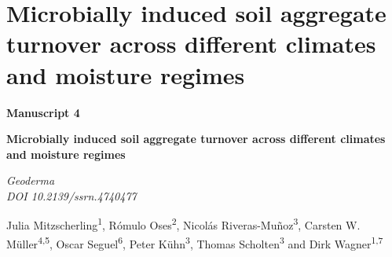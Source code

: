 \chapter{Microbially induced soil aggregate turnover across different climates and moisture regimes}
\label{chap:manuscript4} %

\begin{center}
  \textbf{\Large Manuscript 4}
\end{center}  

\vspace{0.1cm}

\begin{center}
  \textbf{\huge Microbially induced soil aggregate turnover across different climates and moisture regimes}
\end{center}

\vspace{0.2cm}

\begin{center}
  \textit{Geoderma}\\
  \textit{DOI 10.2139/ssrn.4740477}
\end{center}

\vspace{0.1cm}

\begin{justify}
    Julia Mitzscherling\textsuperscript{1}, Rómulo Oses\textsuperscript{2}, Nicolás Riveras-Muñoz\textsuperscript{3}, Carsten W. Müller\textsuperscript{4,5}, Oscar Seguel\textsuperscript{6},   Peter Kühn\textsuperscript{3}, Thomas Scholten\textsuperscript{3} and Dirk Wagner\textsuperscript{1,7}
\end{justify}

  \vspace{0.2cm}
  
